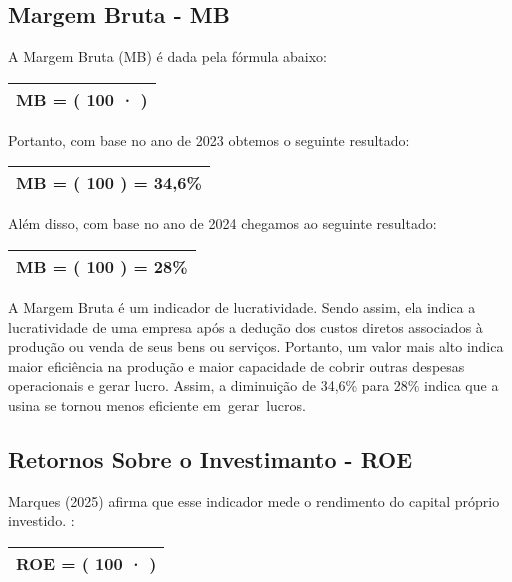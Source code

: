 \documentclass[1pt,a4paper]{article}
\begin{document}
	\subsection{Margem Bruta - MB}
	
	\hspace*{1.5cm} A Margem Bruta (MB) é dada pela fórmula abaixo:
		\begin{center}
			\begin{tabular}{|c|}
				\hline
				MB = \left( 100 · \left[ \frac{LUCRO \, BRUTO}{RECEITA \, LIQUIDA} \right] \right)  \\
				\hline
			\end{tabular}
		\end{center}
	Portanto, com base no ano de 2023 obtemos o seguinte resultado:
		\begin{center}
			\begin{tabular}{|c|}
				\hline
				MB = \left( 100  \left[ \frac{1.749.674}{4.376.917} \right] \right) = 34,6\% \\
				\hline
			\end{tabular}
		\end{center}
	Além disso, com base no ano de 2024 chegamos ao seguinte resultado:
		\begin{center}
			\begin{tabular}{|c|}
				\hline
				MB = \left( 100  \left[ \frac{1.384.286}{4.928.662} \right] \right) = 28\% \\
				\hline
			\end{tabular}
		\end{center}
		
	A Margem Bruta é um indicador de lucratividade. Sendo assim, ela indica a lucratividade de uma empresa após a dedução dos custos diretos associados à produção ou venda de seus bens ou serviços. Portanto, um valor mais alto indica maior eficiência na produção e maior capacidade de cobrir outras despesas operacionais e gerar lucro. Assim, a diminuição de 34,6\% para 28\% indica que a usina se tornou menos eficiente em gerar lucros.
		
	\subsection{Retornos Sobre o Investimanto - ROE}
	
	\hspace*{1.5cm} Marques (2025) afirma que esse indicador mede o rendimento do capital próprio investido. :
		
		\begin{center}
			\begin{tabular}{|c|}
				\hline
				ROE = \left( 100 · \left[ \frac{LUCRO \, LIQUIDO}{PAT. \, LÍQUIDO} \right] \right)  \\
				\hline
			\end{tabular}
		\end{center}
		
\end{document}

